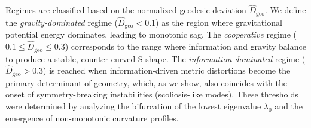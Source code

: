 \documentclass[11pt]{article}
\begin{document}
Regimes are classified based on the normalized geodesic deviation $\widehat{D}_{\mathrm{geo}}$. We define the \emph{gravity-dominated} regime ($\widehat{D}_{\mathrm{geo}} < 0.1$) as the region where gravitational potential energy dominates, leading to monotonic sag. The \emph{cooperative} regime ($0.1 \leq \widehat{D}_{\mathrm{geo}} \leq 0.3$) corresponds to the range where information and gravity balance to produce a stable, counter-curved S-shape. The \emph{information-dominated} regime ($\widehat{D}_{\mathrm{geo}} > 0.3$) is reached when information-driven metric distortions become the primary determinant of geometry, which, as we show, also coincides with the onset of symmetry-breaking instabilities (scoliosis-like modes). These thresholds were determined by analyzing the bifurcation of the lowest eigenvalue $\lambda_0$ and the emergence of non-monotonic curvature profiles.
\end{document}
